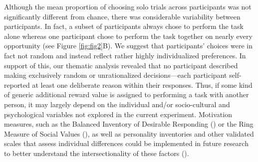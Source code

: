 \documentclass[
  man,
  floatsintext,
  longtable,
  nolmodern,
  notxfonts,
  notimes,
  colorlinks=true,linkcolor=blue,citecolor=blue,urlcolor=blue]{apa7}
\begin{document}
Although the mean proportion of choosing solo trials across participants
was not significantly different from chance, there was considerable
variability between participants. In fact, a subset of participants
always chose to perform the task alone whereas one participant chose to
perform the task together on nearly every opportunity (see Figure
\ref{fig:fig2}B). We suggest that participants' choices were in fact not
random and instead reflect rather highly individualized preferences. In
support of this, our thematic analysis revealed that no participant
described making exclusively random or unrationalized decisions---each
participant self-reported at least one deliberate reason within their
responses. Thus, if some kind of generic additional reward value is
assigned to performing a task with another person, it may largely depend
on the individual and/or socio-cultural and psychological variables not
explored in the current experiment. Motivation measures, such as the
Balanced Inventory of Desirable Responding
() or the Ring Measure of
Social Values (), as well as personality inventories and other validated scales
that assess individual differences could be implemented in future
research to better understand the intersectionality of these factors
().
\end{document}
